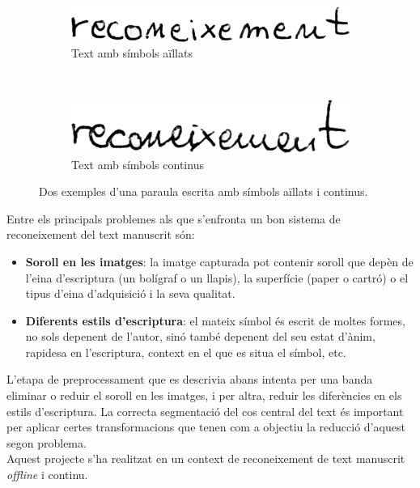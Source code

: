 \begin{figure}
\centering
\begin{subfigure}[b]{0.4\textwidth}
\centering
\includegraphics[width=\textwidth]{images/reconeixement_segmentat.eps}
\caption{Text amb símbols aïllats}\label{fig:text_segmentat}
\end{subfigure}
~
\begin{subfigure}[b]{0.4\textwidth}
\centering
\includegraphics[width=\textwidth]{images/reconeixement_continu.eps}
\caption{Text amb símbols continus}\label{fig:text_continu}
\end{subfigure}
\caption{Dos exemples d'una paraula escrita amb símbols aïllats i continus.}
\end{figure}

Entre els principals problemes als que s'enfronta un bon sistema de reconeixement del text manuscrit són:
\begin{itemize}
\item \textbf{Soroll en les imatges}: la imatge capturada pot contenir soroll que depèn de l'eina d'escriptura (un bolígraf o un llapis), la superfície (paper o cartró) o el tipus d'eina d'adquisició i la seva qualitat.
\item \textbf{Diferents estils d'escriptura}: el mateix símbol és escrit de moltes formes, no sols depenent de l'autor, sinó també depenent del seu estat d'ànim, rapidesa en l'escriptura, context en el que es situa el símbol, etc.
\end{itemize}

L'etapa de preprocessament que es descrivia abans intenta per una banda eliminar o reduir el soroll en les imatges, i per altra, reduir les diferències en els estils d'escriptura. La correcta segmentació del cos central del text és important per aplicar certes transformacions que tenen com a objectiu la reducció d'aquest segon problema.\\

Aquest projecte s'ha realitzat en un context de reconeixement de text manuscrit \emph{offline} i continu.\\


